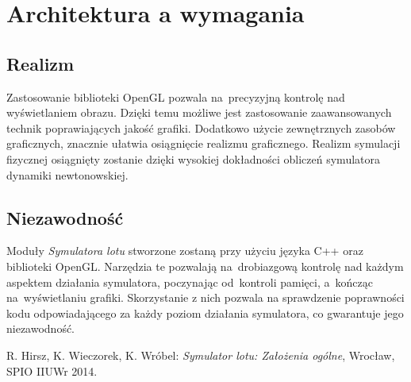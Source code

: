 \documentclass{mwrep}
\begin{document}
\chapter{Architektura a wymagania}

\section{Realizm}
Zastosowanie biblioteki OpenGL pozwala na~precyzyjną kontrolę nad wyświetlaniem obrazu. Dzięki temu możliwe jest zastosowanie zaawansowanych technik poprawiających jakość grafiki. Dodatkowo użycie zewnętrznych zasobów graficznych, znacznie ułatwia osiągnięcie realizmu graficznego. Realizm symulacji fizycznej osiągnięty zostanie dzięki wysokiej dokładności obliczeń symulatora dynamiki newtonowskiej.

\section{Niezawodność}
Moduły \textit{Symulatora lotu} stworzone zostaną przy użyciu języka C++ oraz biblioteki OpenGL. Narzędzia te pozwalają na~drobiazgową kontrolę nad każdym aspektem działania symulatora, poczynając od~kontroli pamięci, a~kończąc na~wyświetlaniu grafiki. Skorzystanie z nich pozwala na sprawdzenie poprawności kodu odpowiadającego za każdy poziom działania symulatora, co gwarantuje jego niezawodność.

\begin{thebibliography}{9}
     R. Hirsz, K. Wieczorek, K. Wróbel: \textit{Symulator lotu: Założenia ogólne}, Wrocław, SPIO IIUWr 2014.
\end{thebibliography}
\end{document}
